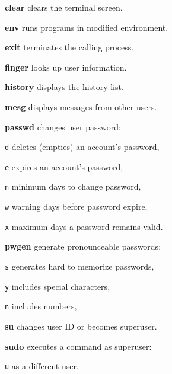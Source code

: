\begin{compactenum}
	\item [\cmdvar] \textbf{clear} clears the terminal screen.
	\item [\cmdvar] \textbf{env} runs programs in modified environment.
	\item [\cmdvar] \textbf{exit} terminates the calling process.
	\item [\cmdvar] \textbf{finger} looks up user information.
	\item [\cmdvar] \textbf{history}  displays the history list. %
	\item [\cmdvar] \textbf{mesg} displays messages from other users.
\end{compactenum}

\begin{compactenum}
	\item [\cmdvar] \textbf{passwd} changes user password:
	\item [\texttt{d}] deletes (empties) an account's password,
	\item [\texttt{e}] expires an account's password,
	\item [\texttt{n}] minimum days to change password,
	\item [\texttt{w}] warning days before password expire,
	\item [\texttt{x}] maximum days a password remains valid.
	\item [\cmdvar] \textbf{pwgen} generate pronounceable passwords:
	\item [\texttt{s}] generates hard to memorize passwords,
	\item [\texttt{y}] includes special characters,
	\item [\texttt{n}] includes numbers,
\end{compactenum}

\begin{compactenum}
        \item [\cmdutil] \textbf{su} changes user ID or becomes superuser.
        \item [\cmdvar] \textbf{sudo} executes a command as superuser:
        \item [\texttt{u}] as a different user.
\end{compactenum}

